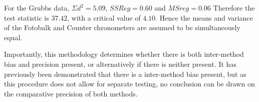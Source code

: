 \documentclass[Main.tex]{subfiles}
\begin{document}
For the Grubbs data, $\Sigma d^{2}=5.09 $, $SSReg = 0.60$ and
$MSreg=0.06$ Therefore the test statistic is $37.42$, with a
critical value of $4.10$. Hence the means and variance of the
Fotobalk and Counter chronometers are assumed to be simultaneously
equal.

Importantly, this methodology determines whether there is both
inter-method bias and precision present, or alternatively if there
is neither present. It has previously been demonstrated that there
is a inter-method bias present, but as this procedure does not
allow for separate testing, no conclusion can be drawn on the
comparative precision of both methods.












\end{document}
